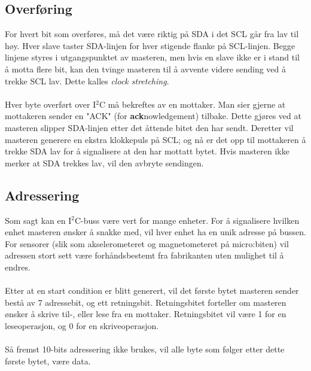 \documentclass[11pt,a4paper]{article}
\begin{document}
\subsection*{Overføring}
For hvert bit som overføres, må det være riktig på SDA i det SCL går fra lav til høy. Hver slave taster SDA-linjen for hver stigende flanke på SCL-linjen. Begge linjene styres i utgangspunktet av masteren, men hvis en slave ikke er i stand til å motta flere bit, kan den tvinge masteren til å avvente videre sending ved å trekke SCL lav. Dette kalles \textit{clock stretching}.\\
\\
Hver byte overført over I$^2$C må bekreftes av en mottaker. Man sier gjerne at mottakeren sender en "ACK" (for \textbf{ack}nowledgement) tilbake. Dette gjøres ved at masteren slipper SDA-linjen etter det åttende bitet den har sendt. Deretter vil masteren generere en ekstra klokkepuls på SCL; og nå er det opp til mottakeren å trekke SDA lav for å signalisere at den har mottatt bytet. Hvis masteren ikke merker at SDA trekkes lav, vil den avbryte sendingen.

\subsection*{Adressering}
Som sagt kan en I$^2$C-buss være vert for mange enheter. For å signalisere hvilken enhet masteren ønsker å snakke med, vil hver enhet ha en unik adresse på bussen. For sensorer (slik som akselerometeret og magnetometeret på micro:biten) vil adressen stort sett være forhåndsbestemt fra fabrikanten uten mulighet til å endres.\\
\\
Etter at en start condition er blitt generert, vil det første bytet masteren sender bestå av 7 adressebit, og ett retningsbit. Retningsbitet forteller om masteren ønsker å skrive til-, eller lese fra en mottaker. Retningsbitet vil være 1 for en leseoperasjon, og 0 for en skriveoperasjon.\\
\\
Så fremst 10-bits adressering ikke brukes, vil alle byte som følger etter dette første bytet, være data.
\end{document}
